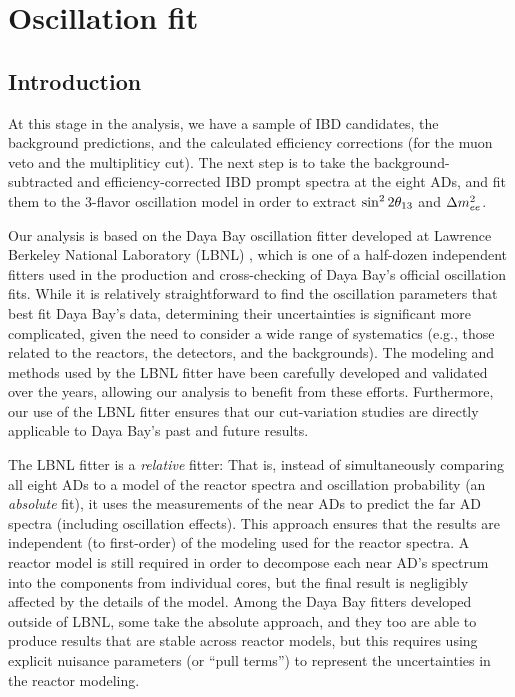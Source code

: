 \documentclass[../thesis.tex]{subfiles}
\begin{document}
\chapter{Oscillation fit}
\label{chap:fitting}

\section{Introduction}
\label{sec:fittingIntro}

At this stage in the analysis, we have a sample of IBD candidates, the background predictions, and the calculated efficiency corrections (for the muon veto and the multipliticy cut). The next step is to take the background-subtracted and efficiency-corrected IBD prompt spectra at the eight ADs, and fit them to the 3-flavor oscillation model in order to extract $\sin^2 2\theta_{13}$ and $\Delta m^2_{ee}$.

Our analysis is based on the Daya Bay oscillation fitter developed at Lawrence Berkeley National Laboratory (LBNL) \cite{berkeley_shapefit,berkeley_toymc}, which is one of a half-dozen independent fitters used in the production and cross-checking of Daya Bay's official oscillation fits. While it is relatively straightforward to find the oscillation parameters that best fit Daya Bay's data, determining their uncertainties is significant more complicated, given the need to consider a wide range of systematics (e.g., those related to the reactors, the detectors, and the backgrounds). The modeling and methods used by the LBNL fitter have been carefully developed and validated over the years, allowing our analysis to benefit from these efforts. Furthermore, our use of the LBNL fitter ensures that our cut-variation studies are directly applicable to Daya Bay's past and future results.

The LBNL fitter is a \emph{relative} fitter: That is, instead of simultaneously comparing all eight ADs to a model of the reactor spectra and oscillation probability (an \emph{absolute} fit), it uses the measurements of the near ADs to predict the far AD spectra (including oscillation effects). This approach ensures that the results are independent (to first-order) of the modeling used for the reactor spectra. A reactor model is still required in order to decompose each near AD's spectrum into the components from individual cores, but the final result is negligibly affected by the details of the model. Among the Daya Bay fitters developed outside of LBNL, some take the absolute approach, and they too are able to produce results that are stable across reactor models, but this requires using explicit nuisance parameters (or ``pull terms'') to represent the uncertainties in the reactor modeling.
\end{document}
